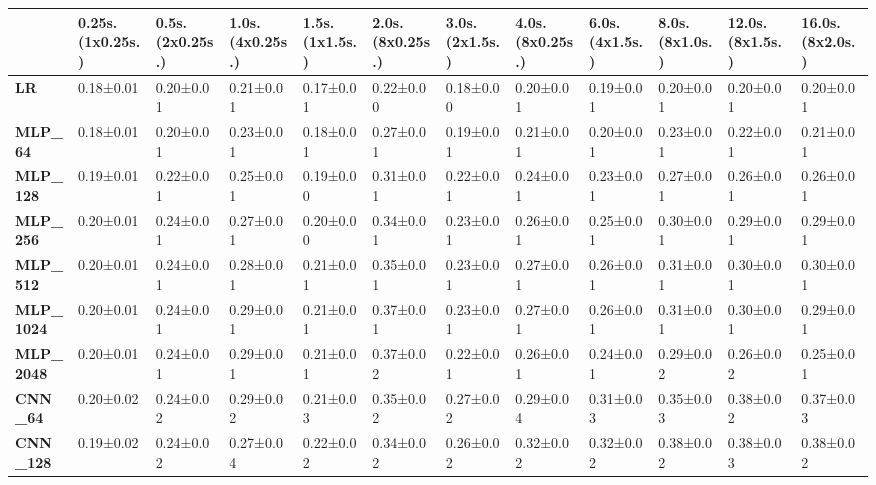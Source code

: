\begin{tabular}{llllllllllll}
\toprule
{} & 0.25s. (1x0.25s.) & 0.5s. (2x0.25s.) & 1.0s. (4x0.25s.) & 1.5s. (1x1.5s.) & 2.0s. (8x0.25s.) & 3.0s. (2x1.5s.) & 4.0s. (8x0.25s.) & 6.0s. (4x1.5s.) & 8.0s. (8x1.0s.) & 12.0s. (8x1.5s.) & 16.0s. (8x2.0s.) \\
\midrule
\textbf{LR            } &         0.18±0.01 &        0.20±0.01 &        0.21±0.01 &       0.17±0.01 &        0.22±0.00 &       0.18±0.00 &        0.20±0.01 &       0.19±0.01 &       0.20±0.01 &        0.20±0.01 &        0.20±0.01 \\
\textbf{MLP\_64        } &         0.18±0.01 &        0.20±0.01 &        0.23±0.01 &       0.18±0.01 &        0.27±0.01 &       0.19±0.01 &        0.21±0.01 &       0.20±0.01 &       0.23±0.01 &        0.22±0.01 &        0.21±0.01 \\
\textbf{MLP\_128       } &         0.19±0.01 &        0.22±0.01 &        0.25±0.01 &       0.19±0.00 &        0.31±0.01 &       0.22±0.01 &        0.24±0.01 &       0.23±0.01 &       0.27±0.01 &        0.26±0.01 &        0.26±0.01 \\
\textbf{MLP\_256       } &         0.20±0.01 &        0.24±0.01 &        0.27±0.01 &       0.20±0.00 &        0.34±0.01 &       0.23±0.01 &        0.26±0.01 &       0.25±0.01 &       0.30±0.01 &        0.29±0.01 &        0.29±0.01 \\
\textbf{MLP\_512       } &         0.20±0.01 &        0.24±0.01 &        0.28±0.01 &       0.21±0.01 &        0.35±0.01 &       0.23±0.01 &        0.27±0.01 &       0.26±0.01 &       0.31±0.01 &        0.30±0.01 &        0.30±0.01 \\
\textbf{MLP\_1024      } &         0.20±0.01 &        0.24±0.01 &        0.29±0.01 &       0.21±0.01 &        0.37±0.01 &       0.23±0.01 &        0.27±0.01 &       0.26±0.01 &       0.31±0.01 &        0.30±0.01 &        0.29±0.01 \\
\textbf{MLP\_2048      } &         0.20±0.01 &        0.24±0.01 &        0.29±0.01 &       0.21±0.01 &        0.37±0.02 &       0.22±0.01 &        0.26±0.01 &       0.24±0.01 &       0.29±0.02 &        0.26±0.02 &        0.25±0.01 \\
\textbf{CNN\_64        } &         0.20±0.02 &        0.24±0.02 &        0.29±0.02 &       0.21±0.03 &        0.35±0.02 &       0.27±0.02 &        0.29±0.04 &       0.31±0.03 &       0.35±0.03 &        0.38±0.02 &        0.37±0.03 \\
\textbf{CNN\_128       } &         0.19±0.02 &        0.24±0.02 &        0.27±0.04 &       0.22±0.02 &        0.34±0.02 &       0.26±0.02 &        0.32±0.02 &       0.32±0.02 &       0.38±0.02 &        0.38±0.03 &        0.38±0.02 \\

\end{tabular}
